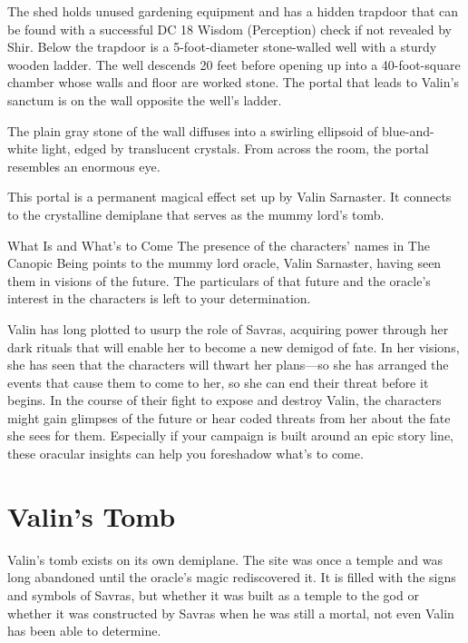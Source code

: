 \documentclass[10pt,a4paper,twoside,bg=print,twocolumn,openany,nodeprecatedcode]{dndbook}
\begin{document}
The shed holds unused gardening equipment and has a hidden trapdoor that can be found with a successful DC 18 Wisdom (Perception) check if not revealed by Shir. Below the trapdoor is a 5-foot-diameter stone-walled well with a sturdy wooden ladder. The well descends 20 feet before opening up into a 40-foot-square chamber whose walls and floor are worked stone. The portal that leads to Valin's sanctum is on the wall opposite the well's ladder.

\begin{DndReadAloud}{}
The plain gray stone of the wall diffuses into a swirling ellipsoid of blue-and-white light, edged by translucent crystals. From across the room, the portal resembles an enormous eye.

\end{DndReadAloud}

This portal is a permanent magical effect set up by Valin Sarnaster. It connects to the crystalline demiplane that serves as the mummy lord's tomb.

\begin{DndSidebar}[float=!b]{What Is and What's to Come}
The presence of the characters' names in The Canopic Being points to the mummy lord oracle, Valin Sarnaster, having seen them in visions of the future. The particulars of that future and the oracle's interest in the characters is left to your determination.



Valin has long plotted to usurp the role of Savras, acquiring power through her dark rituals that will enable her to become a new demigod of fate. In her visions, she has seen that the characters will thwart her plans—so she has arranged the events that cause them to come to her, so she can end their threat before it begins. In the course of their fight to expose and destroy Valin, the characters might gain glimpses of the future or hear coded threats from her about the fate she sees for them. Especially if your campaign is built around an epic story line, these oracular insights can help you foreshadow what's to come.



\end{DndSidebar}

\section{Valin's Tomb}
Valin's tomb exists on its own demiplane. The site was once a temple and was long abandoned until the oracle's magic rediscovered it. It is filled with the signs and symbols of Savras, but whether it was built as a temple to the god or whether it was constructed by Savras when he was still a mortal, not even Valin has been able to determine.
\end{document}
